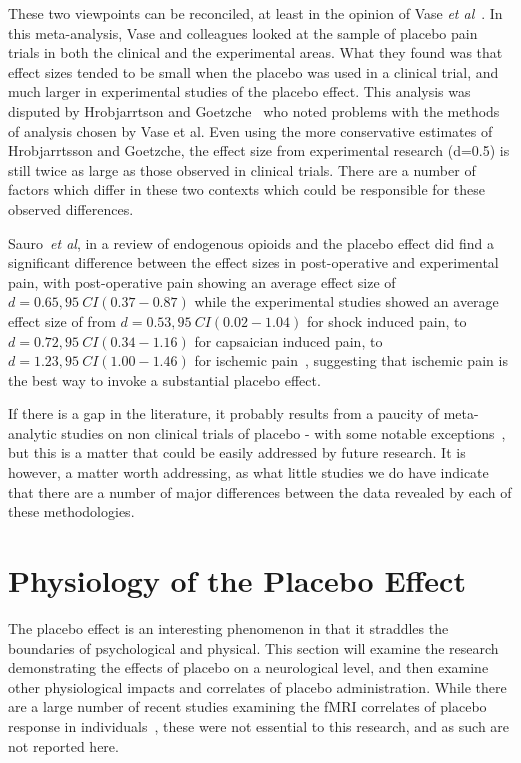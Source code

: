 These two viewpoints can be reconciled, at least in the opinion of Vase \textit{et al}~\cite{Vase2002}. In this meta-analysis, Vase and colleagues looked at the sample of placebo pain trials in both the clinical  and  the experimental areas. What they found was that effect sizes tended to be small when the placebo was used in a clinical trial, and much larger in experimental studies of the placebo effect. This analysis was disputed by Hrobjarrtson and Goetzche~\cite{hrobjartsson2003} who noted problems with the methods of analysis chosen by Vase et al. Even using the more conservative estimates of Hrobjarrtsson and Goetzche, the effect size from experimental research (d=0.5) is still twice as large as those observed in clinical trials. There are a number of factors which differ in these two contexts which could be responsible for these observed differences.  

Sauro~\textit{et al}, in a review of endogenous opioids and the placebo effect did find a significant difference between the effect sizes in post-operative and experimental pain, with post-operative pain showing an average effect size of $d=0.65, 95~CI(0.37-0.87)$ while the experimental studies showed an average effect size of from $d=0.53, 95~CI(0.02-1.04)$ for shock induced pain, to $d=0.72, 95~CI(0.34-1.16)$ for capsaician induced pain, to $d=1.23, 95~CI(1.00-1.46)$ for ischemic pain~\cite{Sauro2005}, suggesting that ischemic pain is the best way to invoke a substantial placebo effect.


If there is a gap in the literature, it probably results from a paucity of meta-analytic studies on non clinical trials of placebo - with some notable exceptions~\cite{Wampol2007,Vase2002}, but this is a matter that could be easily addressed by future research. It is however, a matter worth addressing, as what little studies we do have indicate that there are a number of major differences between the data revealed by each of these methodologies. 






\section{Physiology of the Placebo Effect}
\label{sec:neur-plac-effect}


The placebo effect is an interesting phenomenon in that it straddles the boundaries of psychological and physical. This section will examine the research demonstrating the effects of placebo on a neurological level, and then examine other physiological impacts and correlates of placebo administration. While there are a large number of recent studies examining the fMRI correlates of placebo response in individuals~\cite{Benedetti2005a}, these were not essential to this research, and as such are not reported here. 


